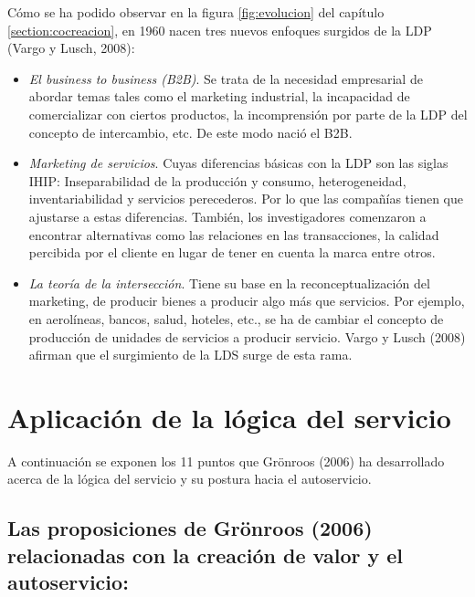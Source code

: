 Cómo se ha podido observar en la figura \ref{fig:evolucion} del capítulo \ref{section:cocreacion}, en 1960 nacen tres nuevos enfoques surgidos de la LDP (Vargo y Lusch, 2008):

\begin{itemize}
	\item \emph{El business to business (B2B)}. Se trata de la necesidad empresarial de abordar temas tales como el marketing industrial, la incapacidad de comercializar con ciertos productos, la incomprensión por parte de la LDP del concepto de intercambio, etc. De este modo nació el B2B.
	\item \emph{Marketing de servicios}. Cuyas diferencias básicas con la LDP son las siglas IHIP: Inseparabilidad de la producción y consumo, heterogeneidad, inventariabilidad y servicios perecederos. Por lo que las compañías tienen que ajustarse a estas diferencias. También, los investigadores comenzaron a encontrar alternativas como las relaciones en las transacciones, la calidad percibida por el cliente en lugar de tener en cuenta la marca entre otros.
	\item \emph{La teoría de la intersección}. Tiene su base en la reconceptualización del marketing, de producir bienes a producir algo más que servicios. Por ejemplo, en aerolíneas, bancos, salud, hoteles, etc., se ha de cambiar el concepto de producción de unidades de servicios a producir servicio. Vargo y Lusch (2008) afirman que el surgimiento de la LDS surge de esta rama.
\end{itemize}

\chapter{Aplicación de la lógica del servicio}
\label{anexo:5}

A continuación se exponen los 11 puntos que Grönroos (2006) ha desarrollado acerca de la lógica del servicio y su postura hacia el autoservicio.


\section{Las proposiciones de Grönroos (2006) relacionadas con la creación de valor y el autoservicio:}

